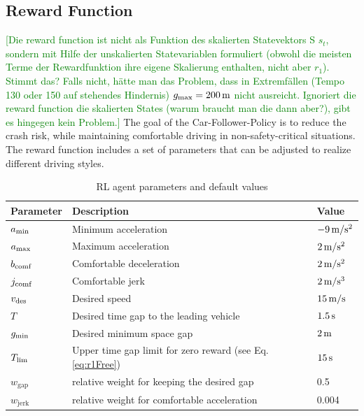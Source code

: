 \documentclass[review]{elsarticle}
\providecommand{\green}[1]{\textcolor{green}{#1}}
\providecommand{\martinc}[1]{\green{[#1]}} %
\providecommand{\sub}[1]{_{\mathrm{#1}}}  %
\providecommand{\3}{{\ss}}
\begin{document}
\subsection{Reward Function}
\label{rewardFunctionFollow}
\martinc{Die reward function ist nicht als Funktion des skalierten
  Statevektors S $s_t$, sondern mit Hilfe der unskalierten Statevariablen
  formuliert (obwohl die meisten Terme der Rewardfunktion ihre eigene
  Skalierung enthalten, nicht aber $r_1$). Stimmt das? Falls nicht, h\"atte man das Problem, dass
  in Extremf\"allen (Tempo 130 oder 150 auf stehendes Hindernis)
  $g\sub{max}=\unit[200]{m}$ nicht ausreicht. Ignoriert die reward
  function die skalierten States (warum braucht man die dann aber?),
  gibt es hingegen kein Problem.}
The goal of the Car-Follower-Policy is to reduce the crash risk, while
maintaining comfortable driving in non-safety-critical situations. The
reward function includes a set of parameters that can be
adjusted to realize different driving styles. 

\begin{table}
	\caption{RL agent parameters and default values} 
	\label{tab:agentParameters} 
	\begin{center}
		\begin{tabular}{ p{}| p{}| p{}}
			Parameter & Description & Value \\ \hline
			$a\sub{\rm min}$ & Minimum acceleration & $\unit[-9]{m/s^2}$ \\  
			$a_{\rm max}$ & Maximum acceleration & $\unit[2]{m/s^2}$ \\  
			$b_{\rm comf}$ & Comfortable deceleration & $\unit[2]{m/s^2}$ \\  
			$j_{\rm comf}$ & Comfortable jerk & $\unit[2]{m/s^3}$ \\  
			$v_{\rm des}$ & Desired speed & $\unit[15]{ m/s}$ \\  		
			$T$ & Desired time gap to the leading vehicle & $\unit[1.5]{s}$ \\
			$g_{\rm min}$ & Desired minimum space gap & $\unit[2]{m}$ \\
			$T_{\rm lim}$ & Upper time gap limit for zero reward (see
			Eq. \eqref{eq:r1Free}) & $\unit[15]{s}$ \\
			$w\sub{gap}$ & relative weight for keeping the desired gap & 0.5\\
			$w\sub{jerk}$ & relative weight for comfortable acceleration & 0.004\\
		\end{tabular}
	\end{center}
\end{table}
\end{document}

